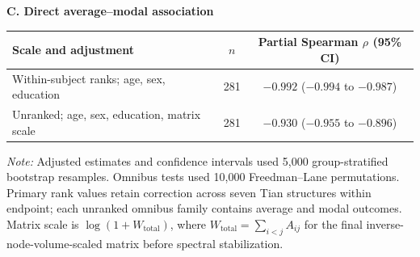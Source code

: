 \documentclass{article}
\begin{document}
\begin{table}[!htbp]
\vspace{3mm}
\textbf{C. Direct average--modal association}\par\vspace{1mm}
\begin{tabular}{lcc}
\toprule
Scale and adjustment & $n$ & Partial Spearman $\rho$ (95\% CI)\\
\midrule
Within-subject ranks; age, sex, education & 281 & $-0.992$ ($-0.994$ to $-0.987$)\\
Unranked; age, sex, education, matrix scale & 281 & $-0.930$ ($-0.955$ to $-0.896$)\\
\bottomrule
\end{tabular}
\par\vspace{1mm}
\footnotesize{\textit{Note:} Adjusted estimates and confidence intervals used 5,000 group-stratified bootstrap resamples. Omnibus tests used 10,000 Freedman--Lane permutations. Primary rank values retain correction across seven Tian structures within endpoint; each unranked omnibus family contains average and modal outcomes. Matrix scale is $\log(1+W_{\mathrm{total}})$, where $W_{\mathrm{total}}=\sum_{i<j}A_{ij}$ for the final inverse-node-volume-scaled matrix before spectral stabilization.}
\end{table}
\end{document}
